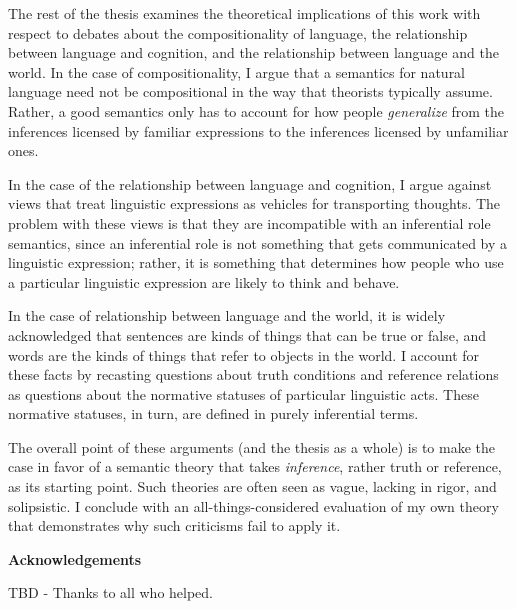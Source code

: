 The rest of the thesis examines the theoretical implications of this work with respect to debates about the compositionality of language, the relationship between language and cognition, and the relationship between language and the world.  In the case of compositionality, I argue that a semantics for natural language need not be compositional in the way that theorists typically assume. Rather, a good semantics only has to account for how people \textit{generalize} from the inferences licensed by familiar expressions to the inferences licensed by unfamiliar ones. 

In the case of the relationship between language and cognition, I argue against views that treat linguistic expressions as vehicles for transporting thoughts. The problem with these views is that they are incompatible with an inferential role semantics, since an inferential role is not something that gets communicated by a linguistic expression; rather, it is something that determines how people who use a particular linguistic expression are likely to think and behave. 

In the case of relationship between language and the world, it is widely acknowledged that sentences are kinds of things that can be true or false, and words are the kinds of things that refer to objects in the world. I account for these facts by recasting questions about truth conditions and reference relations as questions about the normative statuses of particular linguistic acts. These normative statuses, in turn, are defined in purely inferential terms. 

The overall point of these arguments (and the thesis as a whole) is to make the case in favor of a semantic theory that takes \textit{inference}, rather truth or reference, as its starting point. Such theories are often seen as vague, lacking in rigor, and solipsistic. I conclude with an all-things-considered evaluation of my own theory that demonstrates why such criticisms fail to apply it. 

\cleardoublepage


\begin{center}\textbf{Acknowledgements}\end{center}

TBD - Thanks to all who helped.
\cleardoublepage

\renewcommand\contentsname{Table of Contents}
\tableofcontents
\cleardoublepage
{}    %

\listoftables
\cleardoublepage
{}		%

\listoffigures
\cleardoublepage
{}		%


